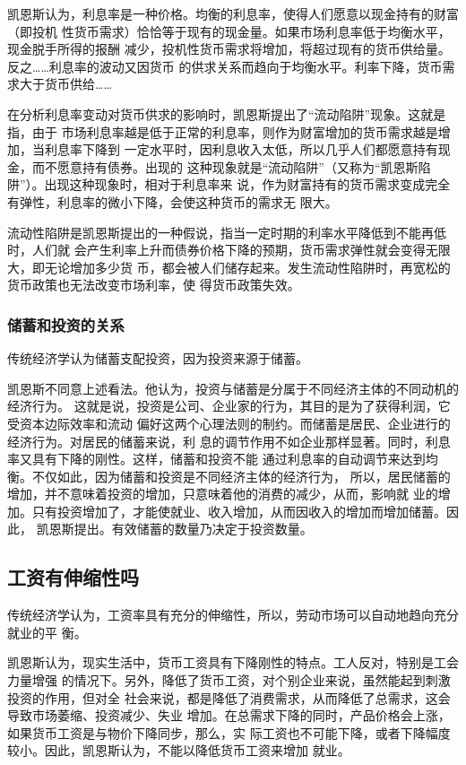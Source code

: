 凯恩斯认为，利息率是一种价格。均衡的利息率，使得人们愿意以现金持有的财富（即投机
性货币需求）恰恰等于现有的现金量。如果市场利息率低于均衡水平，现金脱手所得的报酬
减少，投机性货币需求将增加，将超过现有的货币供给量。反之……利息率的波动又因货币
的供求关系而趋向于均衡水平。利率下降，货币需求大于货币供给……

在分析利息率变动对货币供求的影响时，凯恩斯提出了“流动陷阱”现象。这就是指，由于
市场利息率越是低于正常的利息率，则作为财富增加的货币需求越是增加，当利息率下降到
一定水平时，因利息收入太低，所以几乎人们都愿意持有现金，而不愿意持有债券。出现的
这种现象就是“流动陷阱”（又称为“凯恩斯陷阱”）。出现这种现象时，相对于利息率来
说，作为财富持有的货币需求变成完全有弹性，利息率的微小下降，会使这种货币的需求无
限大。

流动性陷阱是凯恩斯提出的一种假说，指当一定时期的利率水平降低到不能再低时，人们就
会产生利率上升而债券价格下降的预期，货币需求弹性就会变得无限大，即无论增加多少货
币，都会被人们储存起来。发生流动性陷阱时，再宽松的货币政策也无法改变市场利率，使
得货币政策失效。

\subsubsection{储蓄和投资的关系}

传统经济学认为储蓄支配投资，因为投资来源于储蓄。

凯恩斯不同意上述看法。他认为，投资与储蓄是分属于不同经济主体的不同动机的经济行为。
这就是说，投资是公司、企业家的行为，其目的是为了获得利润，它受资本边际效率和流动
偏好这两个心理法则的制约。而储蓄是居民、企业进行的经济行为。对居民的储蓄来说，利
息的调节作用不如企业那样显著。同时，利息率又具有下降的刚性。这样，储蓄和投资不能
通过利息率的自动调节来达到均衡。不仅如此，因为储蓄和投资是不同经济主体的经济行为，
所以，居民储蓄的增加，并不意味着投资的增加，只意味着他的消费的减少，从而，影响就
业的增加。只有投资增加了，才能使就业、收入增加，从而因收入的增加而增加储蓄。因此，
凯恩斯提出。有效储蓄的数量乃决定于投资数量。

\subsection{工资有伸缩性吗}

传统经济学认为，工资率具有充分的伸缩性，所以，劳动市场可以自动地趋向充分就业的平
衡。

凯恩斯认为，现实生活中，货币工资具有下降刚性的特点。工人反对，特别是工会力量增强
的情况下。另外，降低了货币工资，对个别企业来说，虽然能起到刺激投资的作用，但对全
社会来说，都是降低了消费需求，从而降低了总需求，这会导致市场萎缩、投资减少、失业
增加。在总需求下降的同时，产品价格会上涨，如果货币工资是与物价下降同步，那么，实
际工资也不可能下降，或者下降幅度较小。因此，凯恩斯认为，不能以降低货币工资来增加
就业。

